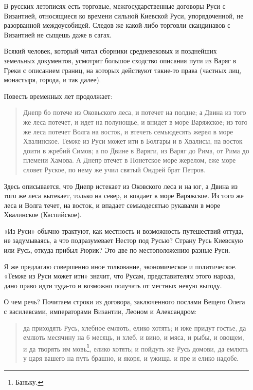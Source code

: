 В русских летописях есть торговые, межгосударственные договоры Руси с Византией, относящиеся ко времени сильной Киевской Руси, упорядоченной, не разорванной междоусобицей. Следов же какой-либо торговли скандинавов с Византией не сыщешь даже в сагах.
 
Всякий человек, который читал сборники средневековых и позднейших земельных документов, усмотрит большое сходство описания пути из Варяг в Греки с описанием границ, на которых действуют такие-то права (частных лиц, монастыря, города, и так далее).

Повесть временных лет продолжает:

\begin{quotation}
Днепр бо потече из Оковьского леса, и потечет на полдне; а Двина из того же леса потечет, и идет на полунощье, и внидет в море Варяжское; из того же леса потечет Волга на восток, и втечеть семьюдесять жерел в море Хвалинское. Темже из Руси может ити в Болгары и в Хвалисы, на восток доити в жребий Симов; а по Двине в Варяги, из Варяг до Рима, от Рима до племени Хамова. А Днепр втечет в Понетское море жерелом, еже море словет Руское, по нему же учил святый Ондрей брат Петров.
\end{quotation}

Здесь описывается, что Днепр истекает из Оковского леса и на юг, а Двина из того же леса вытекает, только на север, и впадает в море Варяжское. Из того же леса и Волга течет, на восток, и впадает семьюдесятью рукавами в море Хвалинское (Каспийское). 

«Из Руси» обычно трактуют, как местность и возможность путешествий оттуда, не задумываясь, а что подразумевает Нестор под Русью? Страну Русь Киевскую или Русь, откуда прибыл Рюрик? Это две по местоположению разные Руси.

Я же предлагаю совершенно иное толкование, экономическое и политическое. «Темже из Руси может ити» значит, что Русам, представителям этого народа, дано право идти туда-то и возможно получать от местных некую выгоду.

О чем речь? Почитаем строки из договора, заключенного послами Вещего Олега с василевсами, императорами Византии, Леоном и Александром:

\begin{quotation}  
да приходять Русь, хлебное емлють, елико хотять; и иже придут гостье, да емлють месячину на 6 месяць, и хлеб, и вино, и мяса, и рыбы, и овощем, и да творять им мовь\footnote{Баньку.}, елико хотять; и пойдуть же Русь домови, да емлють у царя вашего на путь брашно, и якоря, и ужища, и пре и елико надобе.
\end{quotation}

